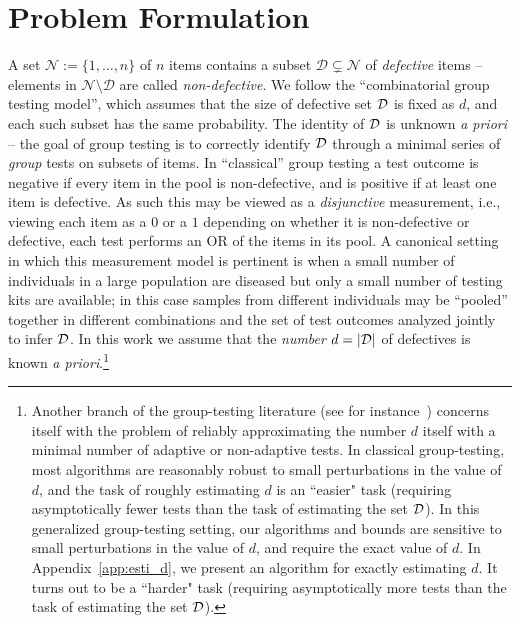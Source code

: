 \documentclass[onecolumn,letterpaper]{IEEEtran}
\newcommand{\cD}{{\cal D}}
\newcommand{\sid}[1]{\textcolor{red}{#1}}
\begin{document}
\section{Problem Formulation}
\label{sec:problem}
A set $\mathcal{N}:=\{1,\dots, n\}$ of $n$ items contains a subset $\mathcal{D}\subsetneq \mathcal{N}$ of  \textit{defective} items -- elements in $\mathcal{N}\setminus \mathcal{D}$ are called \textit{non-defective}. We follow the ``combinatorial group testing model'', which assumes that the size of defective set $\cD$ is fixed as $d$, and each such subset has the same probability. %
The identity of $\cD$ is unknown {\it a priori} -- the goal of group testing is to correctly identify $\cD$ through a minimal series of {\it group} tests on subsets of items. In ``classical'' group testing a test outcome is negative if every item in the pool is non-defective, and is positive if at least one item is defective. As such this may be viewed as a {\it disjunctive} measurement, i.e., viewing each item as a $0$ or a $1$ depending on whether it is non-defective or defective, each test performs an OR of the items in its pool. A canonical setting in which this measurement model is pertinent is when a small number of individuals in a large population are diseased but only a small number of testing kits are available; in this case samples from different individuals may be ``pooled'' together in different combinations and the set of test outcomes analyzed jointly to infer $\cD$. In this work we assume that the {\it number} $d = |{\cD}|$ of defectives is known {\it a priori}.\footnote{\label{fn:est-def} Another branch of the group-testing literature (see for instance~\cite{damaschke2010competitive,falahatgar2016estimating,bshouty2018adaptive}) concerns itself with the problem of reliably approximating the number $d$ itself with a minimal number of adaptive or non-adaptive tests. In classical group-testing, most algorithms are reasonably robust to small perturbations in the value of $d$, and the task of roughly estimating $d$ is an ``easier" task (requiring asymptotically fewer tests than the task of estimating the set $\cD$). In this generalized group-testing setting, our algorithms and bounds are sensitive to small perturbations in the value of $d$, and require the exact value of $d$. In Appendix~\ref{app:esti_d}, we present an algorithm for exactly estimating $d$. It turns out to be a ``harder" task (requiring asymptotically  more tests than the task of estimating the set $\cD$).}
\end{document}
